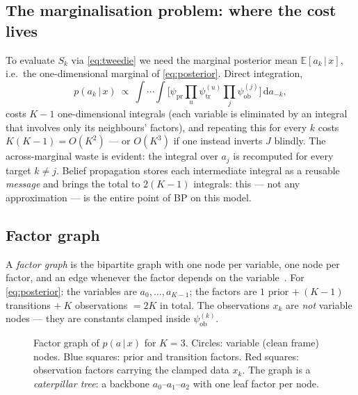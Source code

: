 \documentclass[11pt]{article}
\theoremstyle{definition}
\newcommand{\E}{\mathbb{E}}
\newcommand{\given}{\,|\,}
\newcommand{\dd}{\mathrm{d}}
\begin{document}
\subsection{The marginalisation problem: where the cost lives}

To evaluate $S_k$ via \eqref{eq:tweedie} we need the marginal posterior mean
$\E[a_k\given x]$, i.e.\ the one-dimensional marginal of
\eqref{eq:posterior}. Direct integration,
\[
  p(a_k\given x)\ \propto\ \int\!\cdots\!\int
  \Big[\psi_{\mathrm{pr}}\textstyle\prod_u\psi^{(u)}_{\mathrm{tr}}
  \prod_j\psi^{(j)}_{\mathrm{ob}}\Big]\,\dd a_{-k},
\]
costs $K{-}1$ one-dimensional integrals (each variable is eliminated by an
integral that involves only its neighbours' factors), and repeating this for
every $k$ costs $K(K{-}1)=O(K^2)$ --- or $O(K^3)$ if one instead inverts $J$
blindly. The across-marginal waste is evident: the integral over $a_j$ is
recomputed for every target $k\ne j$. Belief propagation stores each
intermediate integral as a reusable \emph{message} and brings the total to
$2(K{-}1)$ integrals: this --- not any approximation --- is the entire point
of BP on this model.

\subsection{Factor graph}

A \emph{factor graph} is the bipartite graph with one node per variable, one
node per factor, and an edge whenever the factor depends on the
variable~\citep{kschischang2001factor,mezard2009information}. For
\eqref{eq:posterior}: the variables are $a_0,\dots,a_{K-1}$; the factors are
$1$ prior $+\ (K{-}1)$ transitions $+\ K$ observations $=2K$ in total. The
observations $x_k$ are \emph{not} variable nodes --- they are constants
clamped inside $\psi^{(k)}_{\mathrm{ob}}$.

\begin{figure}[h]\centering
{}
\caption{Factor graph of $p(a\given x)$ for $K=3$. Circles: variable (clean
frame) nodes. Blue squares: prior and transition factors. Red squares:
observation factors carrying the clamped data $x_k$. The graph is a
\emph{caterpillar tree}: a backbone $a_0$--$a_1$--$a_2$ with one leaf factor
per node.}
\label{fig:fg}
\end{figure}
\end{document}
